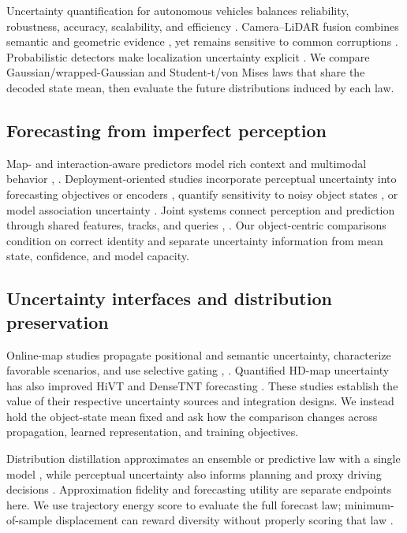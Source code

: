\documentclass[lettersize,journal]{IEEEtran}
\begin{document}
Uncertainty quantification for autonomous vehicles balances reliability, robustness, accuracy, scalability, and efficiency \cite{ref24}. Camera--LiDAR fusion combines semantic and geometric evidence \cite{ref5}, yet remains sensitive to common corruptions \cite{ref6,ref7}. Probabilistic detectors make localization uncertainty explicit \cite{ref8,ref9}. We compare Gaussian/wrapped-Gaussian and Student-t/von Mises laws that share the decoded state mean, then evaluate the future distributions induced by each law.

\subsection{Forecasting from imperfect perception}
\label{subsec:section2-2}

Map- and interaction-aware predictors model rich context and multimodal behavior \cite{ref1,ref2,ref3,ref4}, \cite{ref23}. Deployment-oriented studies incorporate perceptual uncertainty into forecasting objectives or encoders \cite{ref11,ref12}, quantify sensitivity to noisy object states \cite{ref16}, or model association uncertainty \cite{ref25,ref26}. Joint systems connect perception and prediction through shared features, tracks, and queries \cite{ref18,ref19,ref20,ref21,ref22}, \cite{ref27,ref28}. Our object-centric comparisons condition on correct identity and separate uncertainty information from mean state, confidence, and model capacity.

\subsection{Uncertainty interfaces and distribution preservation}
\label{subsec:section2-3}

Online-map studies propagate positional and semantic uncertainty, characterize favorable scenarios, and use selective gating \cite{ref10}, \cite{ref13,ref14,ref15}. Quantified HD-map uncertainty has also improved HiVT and DenseTNT forecasting \cite{ref17}. These studies establish the value of their respective uncertainty sources and integration designs. We instead hold the object-state mean fixed and ask how the comparison changes across propagation, learned representation, and training objectives.

Distribution distillation approximates an ensemble or predictive law with a single model \cite{ref29}, while perceptual uncertainty also informs planning and proxy driving decisions \cite{ref30,ref31}. Approximation fidelity and forecasting utility are separate endpoints here. We use trajectory energy score to evaluate the full forecast law; minimum-of-sample displacement can reward diversity without properly scoring that law \cite{ref32,ref33,ref34}.
\end{document}
